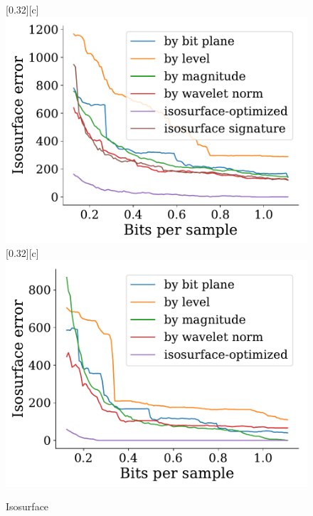 \documentclass{article}
\begin{document}
\begin{figure}[htb]
        [0.32\linewidth][c]{%
               \includegraphics[width=0.3\linewidth]{img/supplementary/isocontour-optimized-foam}}
        [0.32\linewidth][c]{%
                \includegraphics[width=0.3\linewidth]{img/supplementary/isocontour-optimized-karfs}}
        \caption{Isosurface}
\end{figure}
\end{document}

